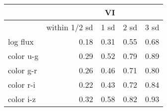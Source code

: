\begin{tabular}{lrrrr}
{} &  &  \textbf{VI} &  & \\
\toprule
{} & within 1/2 sd &  1 sd &  2 sd &  3 sd \\
\midrule
log flux &         0.18 & 0.31 & 0.55 & 0.68 \\
color u-g   &         0.29 & 0.52 & 0.79 & 0.89 \\
color g-r   &         0.26 & 0.46 & 0.71 & 0.80 \\
color r-i   &         0.22 & 0.43 & 0.72 & 0.84 \\
color i-z   &         0.32 & 0.58 & 0.82 & 0.93 \\
\bottomrule
\end{tabular}
